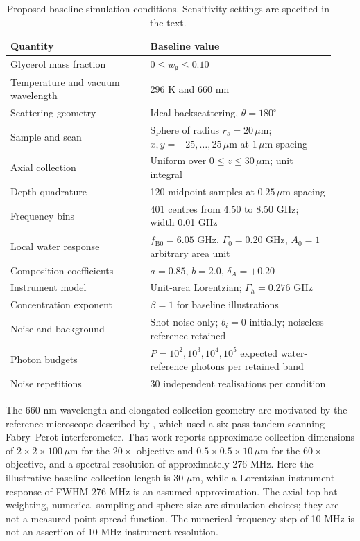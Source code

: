 \documentclass[11pt]{article}
\newcommand{\wg}{w_{\mathrm g}}
\begin{document}
\begin{table}[htbp]\centering\small
\caption{Proposed baseline simulation conditions. Sensitivity settings are specified in the text.}
\label{tab:conditions}
\begin{tabular}{@{}p{0.40\linewidth}p{0.53\linewidth}@{}}\toprule
Quantity & Baseline value \\ \midrule
Glycerol mass fraction & $0\leq\wg\leq0.10$ \\
Temperature and vacuum wavelength & 296 K and 660 nm \\
Scattering geometry & Ideal backscattering, $\theta=180^\circ$ \\
Sample and scan & Sphere of radius $r_s=20\,\mu\mathrm m$; $x,y=-25,\ldots,25\,\mu\mathrm m$ at $1\,\mu\mathrm m$ spacing \\
Axial collection & Uniform over $0\leq z\leq30\,\mu\mathrm m$; unit integral \\
Depth quadrature & 120 midpoint samples at $0.25\,\mu\mathrm m$ spacing \\
Frequency bins & 401 centres from 4.50 to 8.50 GHz; width 0.01 GHz \\
Local water response & $f_{\mathrm B0}=6.05$ GHz, $\Gamma_0=0.20$ GHz, $A_0=1$ arbitrary area unit \\
Composition coefficients & $a=0.85$, $b=2.0$, $\delta_A=+0.20$ \\
Instrument model & Unit-area Lorentzian; $\Gamma_h=0.276$ GHz \\
Concentration exponent & $\beta=1$ for baseline illustrations \\
Noise and background & Shot noise only; $b_i=0$ initially; noiseless reference retained \\
Photon budgets & $P=10^2,10^3,10^4,10^5$ expected water-reference photons per retained band \\
Noise repetitions & 30 independent realisations per condition \\
\bottomrule\end{tabular}\normalsize
\end{table}

The 660 nm wavelength and elongated collection geometry are motivated by the reference microscope described by \citet{mahmodi2024}, which used a six-pass tandem scanning Fabry--Perot interferometer. That work reports approximate collection dimensions of $2\times2\times100\,\mu\mathrm m$ for the $20\times$ objective and $0.5\times0.5\times10\,\mu\mathrm m$ for the $60\times$ objective, and a spectral resolution of approximately 276 MHz. Here the illustrative baseline collection length is 30 $\mu\mathrm m$, while a Lorentzian instrument response of FWHM 276 MHz is an assumed approximation. The axial top-hat weighting, numerical sampling and sphere size are simulation choices; they are not a measured point-spread function. The numerical frequency step of 10 MHz is not an assertion of 10 MHz instrument resolution.
\end{document}
